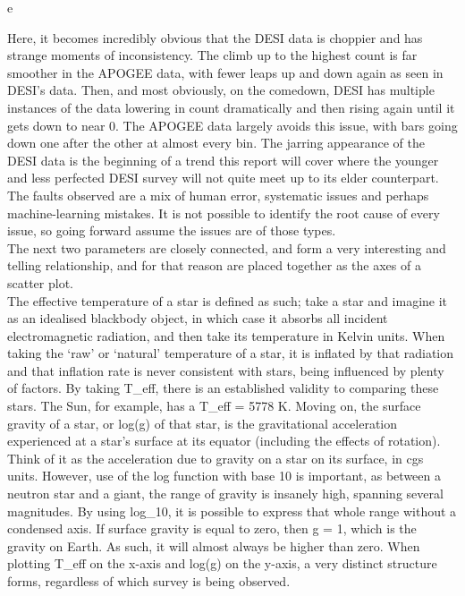 e\documentclass{article}
\begin{document}
\indent Here, it becomes incredibly obvious that the DESI data is choppier and has strange moments of inconsistency. The climb up to the highest count is far smoother in the APOGEE data, with fewer leaps up and down again as seen in DESI’s data. Then, and most obviously, on the comedown, DESI has multiple instances of the data lowering in count dramatically and then rising again until it gets down to near 0. The APOGEE data largely avoids this issue, with bars going down one after the other at almost every bin. The jarring appearance of the DESI data is the beginning of a trend this report will cover where the younger and less perfected DESI survey will not quite meet up to its elder counterpart. The faults observed are a mix of human error, systematic issues and perhaps machine-learning mistakes. It is not possible to identify the root cause of every issue, so going forward assume the issues are of those types.\\
\indent The next two parameters are closely connected, and form a very interesting and telling relationship, and for that reason are placed together as the axes of a scatter plot. \\
\indent The effective temperature of a star is defined as such; take a star and imagine it as an idealised blackbody object, in which case it absorbs all incident electromagnetic radiation, and then take its temperature in Kelvin units. When taking the ‘raw’ or ‘natural’ temperature of a star, it is inflated by that radiation and that inflation rate is never consistent with stars, being influenced by plenty of factors. By taking T\_eff, there is an established validity to comparing these stars. The Sun, for example, has a T\_eff = 5778 K. Moving on, the surface gravity of a star, or log(g) of that star, is the gravitational acceleration experienced at a star's surface at its equator (including the effects of rotation). Think of it as the acceleration due to gravity on a star on its surface, in cgs units. However, use of the log function with base 10 is important, as between a neutron star and a giant, the range of gravity is insanely high, spanning several magnitudes. By using log\_10, it is possible to express that whole range without a condensed axis. If surface gravity is equal to zero, then g = 1, which is the gravity on Earth. As such, it will almost always be higher than zero. When plotting T\_eff on the x-axis and log(g) on the y-axis, a very distinct structure forms, regardless of which survey is being observed.\\
\end{document}
